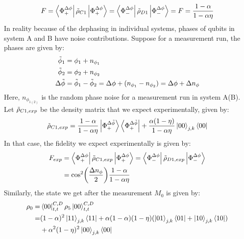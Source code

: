 \begin{equation}
    F = \bra{\Phi^{\Delta\phi}_{+}}\Tilde{\rho}_{C1}\ket{\Phi^{\Delta\phi}_{+}}=\bra{\Phi^{\Delta\phi}_{-}}\Tilde{\rho}_{D1}\ket{\Phi^{\Delta\phi}_{-}} = F =\frac{1-\alpha}{1-\alpha\eta}
\end{equation}
In reality because of the dephasing in individual systems, phases of qubits in system A and B have noise contributions. Suppose for a measurement run, the phases are given by:
\begin{subequations}
    \begin{align}
        \Tilde{\phi}_{1} &= \phi_{1} + n_{\phi_{1}}\\
        \Tilde{\phi}_{2} &= \phi_{2} + n_{\phi_{2}}\\
        \Delta\Tilde{\phi} &= \Tilde{\phi}_{1}- \Tilde{\phi}_{2} = \Delta\phi + (n_{\phi_{1}}-n_{\phi_{2}}) = \Delta\phi + \Delta n_{\phi}
    \end{align}
\end{subequations}
Here, $n_{\phi_{1(2)}}$ is the random phase noise for a measurement run in system A(B). Let $\Tilde{\rho}_{C1,exp}$ be the density matrix that we expect experimentally, given by:
\begin{align}
    \Tilde{\rho}_{C1,exp} = \frac{1-\alpha}{1-\alpha\eta}\ket{\Phi^{\Delta\Tilde{\phi}}_{+}}\bra{\Phi^{\Delta\Tilde{\phi}}_{+}} + \frac{\alpha(1-\eta)}{1-\alpha\eta}\ket{00}_{j,k}\bra{00}
\end{align}
In that case, the fidelity we expect experimentally is given by:
\begin{subequations}
   \begin{align}
        F_{exp} &= \bra{\Phi^{\Delta\phi}_{+}}\Tilde{\rho}_{C1,exp}\ket{\Phi^{\Delta\phi}_{+}}=\bra{\Phi^{\Delta\phi}_{-}}\Tilde{\rho}_{D1,exp}\ket{\Phi^{\Delta\phi}_{-}}\\
        &= \text{cos}^{2}\bigg(\frac{\Delta n_{\phi}}{2}\bigg)\frac{1-\alpha}{1-\alpha\eta}
    \end{align} 
\end{subequations}
Similarly, the state we get after the measurement $M_{0}$ is given by:
\begin{subequations}
    \begin{align}
       \rho_{0} =& \bra{00}^{C,D}_{t,t}\rho_{5}\ket{00}^{C,D}_{t,t}\\ 
       =& (1-\alpha)^2\ket{11}_{j,k}\bra{11} + \alpha(1-\alpha)(1-\eta)(\ket{01}_{j,k}\bra{01} + \ket{10}_{j,k}\bra{10})\nonumber\\
       &+ \alpha^2(1-\eta)^2\ket{00}_{j,k}\bra{00}
    \end{align}
\end{subequations}
